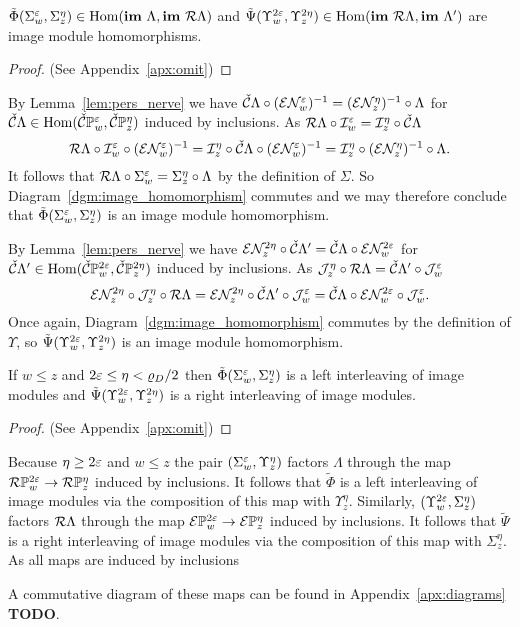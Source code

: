 \begin{lemma}\label{lem:rips_homomorphism_left}
  $\tilde{\Phi}(\Sigma_w^\varepsilon,\Sigma_z^\eta)\in\mathrm{Hom}(\mathbf{im}~\Lambda,\mathbf{im}~\mathcal{R}\Lambda)$ and $\tilde{\Psi}(\Upsilon_w^{2\varepsilon},\Upsilon_z^{2\eta})\in\mathrm{Hom}(\mathbf{im}~\mathcal{R}\Lambda,\mathbf{im}~\Lambda')$ are image module homomorphisms.
\end{lemma}
\begin{proof}
  (See Appendix~\ref{apx:omit})
\end{proof}
\proofatend
  By Lemma~\ref{lem:pers_nerve} we have $\check{\mathcal{C}}\Lambda\circ (\mathcal{E}\mathcal{N}_w^\varepsilon)^{-1} = (\mathcal{E}\mathcal{N}_z^\eta)^{-1}\circ \Lambda$ for $\check{\mathcal{C}}\Lambda\in\mathrm{Hom}(\check{\mathcal{C}}\mathbb{P}_{w}^{\varepsilon},\check{\mathcal{C}}\mathbb{P}_{z}^{\eta})$ induced by inclusions.
  As $\mathcal{R}\Lambda\circ\mathcal{I}_w^\varepsilon = \mathcal{I}_z^\eta\circ\check{\mathcal{C}}\Lambda$
  \[ \mathcal{R}\Lambda\circ \mathcal{I}_w^\varepsilon\circ(\mathcal{E}\mathcal{N}_w^\varepsilon)^{-1} = \mathcal{I}_z^\eta\circ\check{\mathcal{C}}\Lambda\circ (\mathcal{E}\mathcal{N}_w^\varepsilon)^{-1} = \mathcal{I}_z^\eta\circ (\mathcal{E}\mathcal{N}_z^\eta)^{-1}\circ\Lambda.\]
  It follows that $\mathcal{R}\Lambda\circ\Sigma_w^\varepsilon = \Sigma_z^\eta\circ\Lambda$ by the definition of $\Sigma$.
  So Diagram~\ref{dgm:image_homomorphism} commutes and we may therefore conclude that $\tilde{\Phi}(\Sigma_w^\varepsilon,\Sigma_z^\eta)$ is an image module homomorphism.

  By Lemma~\ref{lem:pers_nerve} we have $\mathcal{E}\mathcal{N}_z^{2\eta} \circ\check{\mathcal{C}}\Lambda'  = \check{\mathcal{C}} \Lambda\circ \mathcal{E}\mathcal{N}_w^{2\varepsilon}$ for $\check{\mathcal{C}}\Lambda'\in\mathrm{Hom}(\check{\mathcal{C}}\mathbb{P}_{w}^{2\varepsilon},\check{\mathcal{C}}\mathbb{P}_{z}^{2\eta})$ induced by inclusions.
  As $\mathcal{J}_z^\eta\circ \mathcal{R}\Lambda = \check{\mathcal{C}}\Lambda'\circ\mathcal{J}_w^\varepsilon$
  \[ \mathcal{E}\mathcal{N}_z^{2\eta}\circ \mathcal{J}_z^\eta\circ \mathcal{R}\Lambda = \mathcal{E}\mathcal{N}_z^{2\eta}\circ\check{\mathcal{C}}\Lambda'\circ\mathcal{J}_w^\varepsilon = \check{\mathcal{C}} \Lambda\circ \mathcal{E}\mathcal{N}_w^{2\varepsilon}\circ\mathcal{J}_w^\varepsilon.\]
  Once again, Diagram~\ref{dgm:image_homomorphism} commutes by the definition of $\Upsilon$, so $\tilde{\Psi}(\Upsilon_w^{2\varepsilon},\Upsilon_z^{2\eta})$ is an image module homomorphism.
\endproofatend


\begin{corollary}\label{cor:left_right}
  If $w\leq z$ and $2\varepsilon \leq \eta < \varrho_D / 2$ then $\tilde{\Phi}(\Sigma_w^\varepsilon,\Sigma_z^\eta)$ is a left interleaving of image modules and $\tilde{\Psi}(\Upsilon_w^{2\varepsilon},\Upsilon_z^{2\eta})$ is a right interleaving of image modules.
\end{corollary}\begin{proof}
  (See Appendix~\ref{apx:omit})
\end{proof}
\proofatend
  Because $\eta\geq 2\varepsilon$ and $w\leq z$ the pair $(\Sigma_w^\varepsilon, \Upsilon_z^\eta)$ factors $\Lambda$ through the map $\mathcal{R}\mathbb{P}_{w}^{2\varepsilon}\to \mathcal{R}\mathbb{P}_{z}^{\eta}$ induced by inclusions.
  It follows that $\tilde{\Phi}$ is a left interleaving of image modules via the composition of this map with $\Upsilon_z^\eta$.
  Similarly, $(\Upsilon_w^{2\varepsilon}, \Sigma_z^{\eta})$ factors $\mathcal{R}\Lambda$ through the map $\mathcal{E}\mathbb{P}_{w}^{2\varepsilon}\to \mathcal{E}\mathbb{P}_{z}^{\eta}$ induced by inclusions.
  It follows that $\tilde{\Psi}$ is a right interleaving of image modules via the composition of this map with $\Sigma_z^{\eta}$.
  As all maps are induced by inclusions
\endproofatend

A commutative diagram of these maps can be found in Appendix~\ref{apx:diagrams} \textbf{TODO}.
